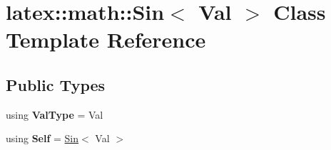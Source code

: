 \hypertarget{classlatex_1_1math_1_1Sin}{\section{latex\-:\-:math\-:\-:Sin$<$ Val $>$ Class Template Reference}
\label{classlatex_1_1math_1_1Sin}
}
\subsection*{Public Types}
\begin{DoxyCompactItemize}
\item 
\hypertarget{classlatex_1_1math_1_1Sin_a72f870181ff4b7ccc3d143179b0c5106}{using {\bfseries Val\-Type} = Val}\label{classlatex_1_1math_1_1Sin_a72f870181ff4b7ccc3d143179b0c5106}

\item 
\hypertarget{classlatex_1_1math_1_1Sin_a5be7c5498ac28547f3aae9a40e137b84}{using {\bfseries Self} = \hyperlink{classlatex_1_1math_1_1Sin}{Sin}$<$ Val $>$}\label{classlatex_1_1math_1_1Sin_a5be7c5498ac28547f3aae9a40e137b84}

\end{DoxyCompactItemize}
